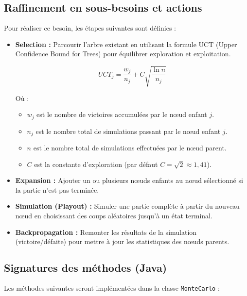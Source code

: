 \documentclass[11pt,a4paper]{article}
\begin{document}
\subsection{Raffinement en sous-besoins et actions}
Pour réaliser ce besoin, les étapes suivantes sont définies :
\begin{itemize}
    \item \textbf{Selection :} Parcourir l'arbre existant en utilisant la formule UCT (Upper Confidence Bound for Trees) pour équilibrer exploration et exploitation.

    \begin{equation}
    UCT_j = \frac{w_j}{n_j} + C \sqrt{\frac{\ln n}{n_j}}
    \end{equation}

    Où :
    \begin{itemize}
        \item $w_j$ est le nombre de victoires accumulées par le nœud enfant $j$.
       \item $n_j$ est le nombre total de simulations passant par le nœud enfant $j$.
      \item $n$ est le nombre total de simulations effectuées par le nœud parent.
      \item $C$ est la constante d'exploration (par défaut $C = \sqrt{2} \approx 1,41$).
    \end{itemize}
    
    \item \textbf{Expansion :} Ajouter un ou plusieurs nœuds enfants au nœud sélectionné si la partie n'est pas terminée.
    \item \textbf{Simulation (Playout) :} Simuler une partie complète à partir du nouveau nœud en choisissant des coups aléatoires jusqu'à un état terminal.
    \item \textbf{Backpropagation :} Remonter les résultats de la simulation (victoire/défaite) pour mettre à jour les statistiques des nœuds parents.
\end{itemize}

\subsection{Signatures des méthodes (Java)}
Les méthodes suivantes seront implémentées dans la classe \texttt{MonteCarlo} :
\end{document}
